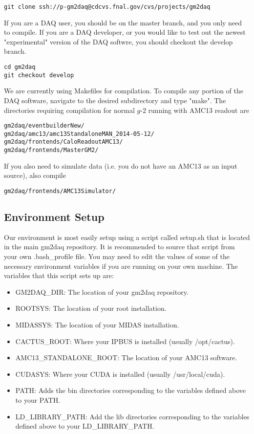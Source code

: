 \begin{verbatim}
git clone ssh://p-gm2daq@cdcvs.fnal.gov/cvs/projects/gm2daq
\end{verbatim}

If you are a DAQ user, you should be on the master branch, and you only need to compile. If you are a DAQ developer, or you would like to test out the newest "experimental" version of the DAQ softwre, you should checkout the develop branch.

\begin{verbatim}
cd gm2daq
git checkout develop
\end{verbatim}

We are currently using Makefiles for compilation. To compile any portion of the DAQ software, navigate to the desired subdirectory and type "make". The directories requiring compilation for normal $g$-$2$ running with AMC13 readout are

\begin{verbatim}
gm2daq/eventbuilderNew/
gm2daq/amc13/amc13StandaloneMAN_2014-05-12/
gm2daq/frontends/CaloReadoutAMC13/
gm2daq/frontends/MasterGM2/
\end{verbatim}

If you also need to simulate data (i.e. you do not have an AMC13 as an input source), also compile

\begin{verbatim}
gm2daq/frontends/AMC13Simulator/
\end{verbatim}

\subsection{Environment Setup}

Our environment is most easily setup using a script called setup.sh that is located in the main gm2daq repository. It is recommended to source that script from your own .bash\_profile file. You may need to edit the values of some of the necessary environment variables if you are running on your own machine. The variables that this script sets up are:

\begin{itemize}
\item GM2DAQ\_DIR: The location of your gm2daq repository.
\item ROOTSYS: The location of your root installation.
\item MIDASSYS: The location of your MIDAS installation.
\item CACTUS\_ROOT: Where your IPBUS is installed (usually /opt/cactus).
\item AMC13\_STANDALONE\_ROOT: The location of your AMC13 software.
\item CUDASYS: Where your CUDA is installed (usually /usr/local/cuda).
\item PATH: Adds the bin directories corresponding to the variables defined above to your PATH.
\item LD\_LIBRARY\_PATH: Add the lib directories corresponding to the variables defined above to your LD\_LIBRARY\_PATH.
\end{itemize}

